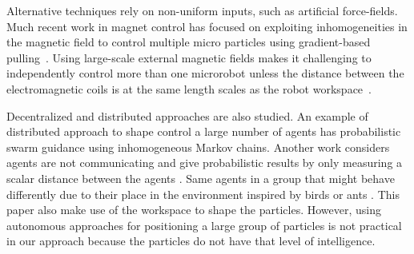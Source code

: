 


Alternative techniques rely on non-uniform inputs, such as artificial force-fields. 
 Much recent work in magnet control has focused on exploiting inhomogeneities in the magnetic field to control multiple micro particles using gradient-based pulling~\cite{Salmanipour2018EightDOF,Denasi2018independent}.  
Using large-scale external magnetic fields makes it challenging to independently control more than one microrobot unless the distance between the electromagnetic coils is at the same length scales as the robot workspace~\cite{diller2016six, Denasi2018independent, Salmanipour2018EightDOF }.
 
 Decentralized and distributed approaches are also studied. An example of distributed approach to shape control a large number of agents has probabilistic swarm guidance using inhomogeneous Markov chains\cite{bandyopadhyay2017probabilistic}. Another work considers agents are not communicating and give probabilistic results by only measuring a scalar distance between the agents \cite{li2017decentralized}. 
  Same agents in a group that might behave differently due to their place in the environment inspired by birds or ants \cite{fine2013eliciting}. This paper also make use of the workspace to shape the particles.
However, using autonomous approaches for positioning a large group of particles is not practical in our approach because the particles do not have that level of intelligence. 


